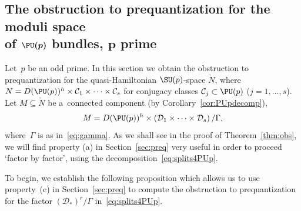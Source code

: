 \subsection[The obstruction to prequantization for the moduli space of $\PU(p)$ bundles, $p$ prime]{The obstruction
to prequantization for the moduli space\\ of $\boldsymbol{\PU(p)}$ bundles, $\boldsymbol{p}$ prime}

Let~$p$ be an odd prime.
In this section we obtain the obstruction to prequantization for the quasi-Hamiltonian $\SU(p)$-space $\check{N}$, where
$N= D(\PU(p))^h \times \mathcal{C}_1 \times \dots \times \mathcal{C}_s $ for conjugacy classes $\mathcal{C}_j \subset
\PU(p)$ ($j=1,\ldots,s$).
Let $M\subseteq \check{N}$ be a~connected component (by Corollary~\ref{cor:PUpdecomp}),
\begin{gather*}
M=D(\PU(p))^h \times \left(\mathcal{D}_1 \times \dots \times \mathcal{D}_s\right)/{\Gamma},
\end{gather*}
where~$\Gamma$ is as in~\eqref{eq:gamma}.
As we shall see in the proof of Theorem~\ref{thm:obs}, we will f\/ind property (a) in Section~\ref{sec:preq} very useful
in order to proceed `factor by factor',
using the decomposition~\eqref{eq:splits4PUp}.

To begin, we establish the following proposition which allows us to use property~(c) in Section~\ref{sec:preq} to
compute the obstruction to prequantization for the factor $(\mathcal{D}_*)^r/\Gamma$ in~\eqref{eq:splits4PUp}.

